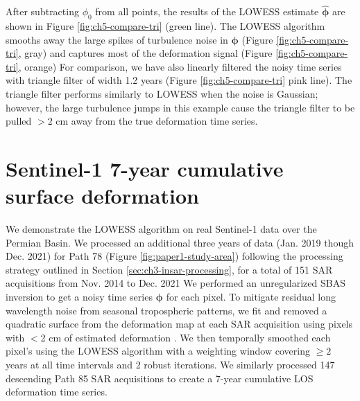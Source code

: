 After subtracting $ \phi_0 $ from all points, the results of the LOWESS estimate $ \bm{\hat{\phi}} $ are shown in Figure \ref{fig:ch5-compare-tri} (green line). The LOWESS algorithm smooths away the large spikes of turbulence noise in  $ \bm{\phi} $ (Figure \ref{fig:ch5-compare-tri}, gray) and captures most of the deformation signal (Figure \ref{fig:ch5-compare-tri}, orange)
For comparison, we have also linearly filtered the noisy time series with triangle filter of width 1.2 years (Figure \ref{fig:ch5-compare-tri} pink line). 
The triangle filter performs similarly to LOWESS when the noise is Gaussian; however, the large turbulence jumps in this example cause the triangle filter to be pulled $>2$ cm away from the true deformation time series.





\section{Sentinel-1 7-year cumulative surface deformation}

We demonstrate the LOWESS algorithm on real Sentinel-1 data over the Permian Basin.
We processed an additional three years of data (Jan. 2019 though Dec. 2021) for Path 78 (Figure \ref{fig:paper1-study-area}) following the processing strategy outlined in Section \ref{sec:ch3-insar-processing}, for a total of 151 SAR acquisitions from Nov. 2014 to Dec. 2021
We performed an unregularized SBAS inversion to get a noisy time series $ \bm{\phi} $ for each pixel. 
To mitigate residual long wavelength noise from seasonal tropospheric patterns, we fit and removed a quadratic surface from the deformation map at each SAR acquisition using pixels with $<$2 cm of estimated deformation \citep{Morishita2020LicsbasOpenSource}. We then temporally smoothed each pixel's using the LOWESS algorithm with a weighting window covering $\geq 2$ years at all time intervals and 2 robust iterations. We similarly processed 147 descending Path 85 SAR acquisitions to create a 7-year cumulative LOS deformation time series.

